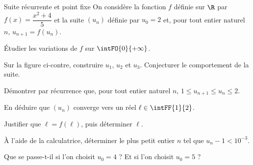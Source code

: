 \begin{exercice}[3]{Suite récurrente et point fixe}
On considère la fonction $f$ définie sur $\R$ par $f(x)=\dfrac{x^{2}+4}{5}$ et la suite $(u_n)$ définie par $u_0=2$ et,
pour tout entier naturel $n$, $u_{n+1}=f(u_n)$.

\noindent
\begin{minipage}[c]{0.56\linewidth}
\begin{questions}
  \item Étudier les variations de $f$ sur $\intFO{0}{+\infty}$.
  \item Sur la figure ci-contre, construire $u_1$, $u_2$ et $u_3$. Conjecturer le comportement de la suite.
  \item Démontrer par récurrence que, pour tout entier naturel $n$, $1\leq u_{n+1}\leq u_n\leq2$.
  \item En déduire que $(u_n)$ converge vers un réel $\ell\in\intFF{1}{2}$.
\end{questions}
\end{minipage}\hfill
\begin{minipage}[c]{0.4\linewidth}
\centering
{}
\end{minipage}
\begin{questions}[start=5]
  \item Justifier que $\ell=f(\ell)$, puis déterminer $\ell$.
  \item À l'aide de la calculatrice, déterminer le plus petit entier $n$ tel que $u_n-1<10^{-3}$.
  \item Que se passe-t-il si l'on choisit $u_0=4$ ? Et si l'on choisit $u_0=5$ ?
\end{questions}
\end{exercice}

